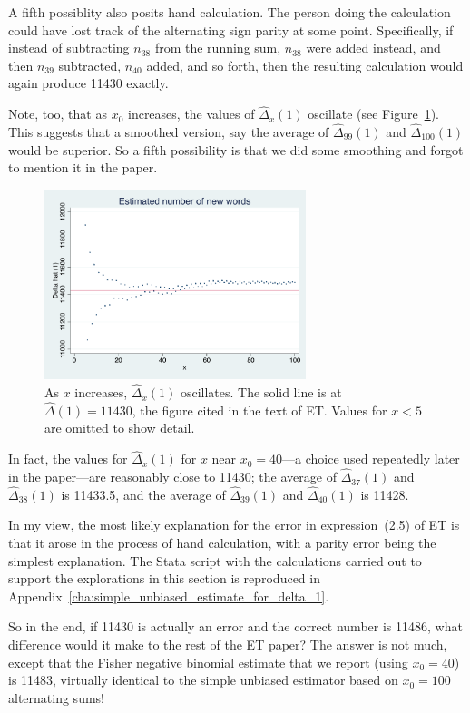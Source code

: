 \documentclass[
  letterpaper, %
  11pt, %
  oneside,  %
  onecolumn,  %
  openany,  %
  article
]{memoir}
\begin{document}
A fifth possiblity also posits hand calculation.  The person doing the calculation could have lost track of the alternating sign parity at some point.  Specifically, if instead of subtracting $n_{38}$ from the running sum, $n_{38}$ were added instead, and then $n_{39}$ subtracted, $n_{40}$ added, and so forth, then the resulting calculation would again produce 11430 exactly.

Note, too, that as $x_0$ increases, the values of $\hat\Delta_x(1)$ oscillate (see Figure~\ref{fig:delta1hat}).  This suggests that a smoothed version, say the average of $\hat\Delta_{99}(1)$ and $\hat\Delta_{100}(1)$ would be superior.  So a fifth possibility is that we did some smoothing and forgot to mention it in the paper.

\begin{figure}
	\centering
	\includegraphics[width=3in]{../compendium/Figures/delta1hat.pdf}
	\caption{As $x$ increases, $\hat\Delta_x(1)$ oscillates.  The solid line is at $\hat\Delta(1)=11430$, the figure cited in the text of ET.  Values for $x<5$ are omitted to show detail.}
	\label{fig:delta1hat}
\end{figure}

In fact, the values for $\hat\Delta_x(1)$ for $x$ near $x_0=40$---a choice used repeatedly later in the paper---are reasonably close to 11430; the average of $\hat\Delta_{37}(1)$ and $\hat\Delta_{38}(1)$ is 11433.5, and the average of $\hat\Delta_{39}(1)$ and $\hat\Delta_{40}(1)$ is 11428.

In my view, the most likely explanation for the error in expression~(2.5) of ET is that it arose in the process of hand calculation, with a parity error being the simplest explanation.  The Stata script with the calculations carried out to support the explorations in this section is reproduced in Appendix~\ref{cha:simple_unbiased_estimate_for_delta_1}.

So in the end, if 11430 is actually an error and the correct number is 11486, what difference would it make to the rest of the ET paper?  The answer is not much, except that the Fisher negative binomial estimate that we report (using $x_0=40$) is 11483, virtually identical to the simple unbiased estimator based on $x_0=100$ alternating sums!
\end{document}
